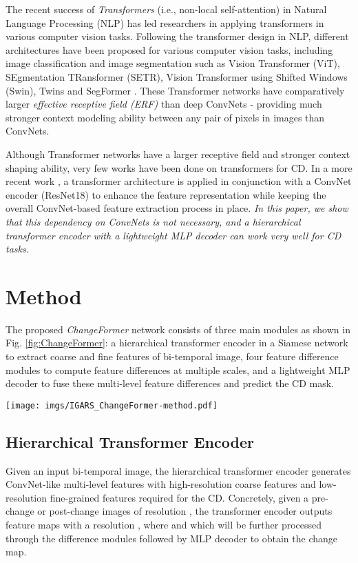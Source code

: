 \documentclass{article}
\def\ChangeFormer{{\textit{ChangeFormer}}}
\begin{document}
The recent success of \textit{ Transformers} (i.e., non-local self-attention) in Natural Language Processing (NLP) has led researchers in  applying transformers in various computer vision tasks. Following the transformer design in NLP, different architectures have been proposed for various computer vision tasks, including image classification and image segmentation such as Vision Transformer (ViT), SEgmentation TRansformer (SETR), Vision Transformer using Shifted Windows (Swin), Twins \cite{transformers_review} and SegFormer \cite{segformer}. These Transformer networks have comparatively larger \textit{ effective receptive field (ERF)} than deep ConvNets - providing much stronger context modeling ability between any pair of pixels in images than ConvNets.

Although Transformer networks have a larger receptive field and stronger context shaping ability, very few works have been done on transformers for CD. In a more recent work \cite{transformer_cd}, a transformer architecture is applied in conjunction with a ConvNet encoder (ResNet18) to enhance the feature representation while keeping the overall ConvNet-based feature extraction process in place. \textit{In this paper, we show that this dependency on ConvNets is not necessary, and a hierarchical transformer encoder with a lightweight MLP decoder can work very well for CD tasks.}

\section{Method}
\label{sec:method}
The proposed \ChangeFormer{} network consists of three main modules as shown in Fig. \ref{fig:ChangeFormer}: a hierarchical transformer encoder in a Siamese network to extract coarse and fine features of bi-temporal image, four feature difference modules to compute feature differences at multiple scales, and a lightweight MLP decoder to fuse these multi-level feature differences and predict the CD mask.
\begin{figure*}[tbh]
    \centering
    \texttt{[image: imgs/IGARS\_ChangeFormer-method.pdf]}
    \caption{The proposed \ChangeFormer{} network for CD.}
    \label{fig:ChangeFormer}
\end{figure*}

\subsection{Hierarchical Transformer Encoder}
Given an input bi-temporal image, the hierarchical transformer encoder generates ConvNet-like multi-level features with high-resolution coarse features and low-resolution fine-grained features required for the CD. Concretely, given a pre-change or post-change images of resolution , the transformer encoder outputs feature maps  with a resolution , where  and  which will be further processed through the difference modules followed by MLP decoder to obtain the change map.
\end{document}
